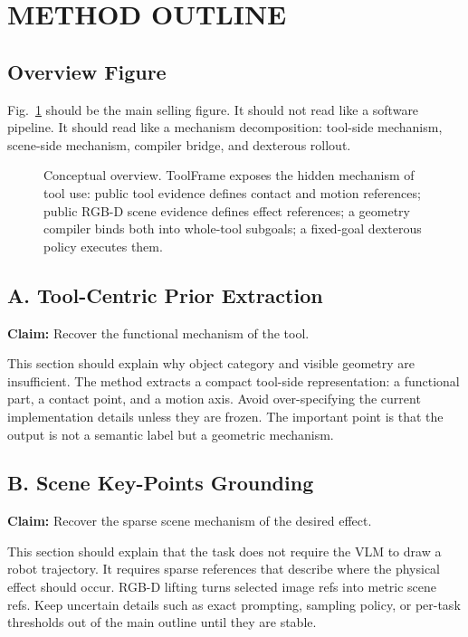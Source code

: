 \documentclass[letterpaper, 10 pt, conference]{ieeeconf}
\newcommand{\method}{ToolFrame}
\newcommand{\claim}[1]{\textbf{Claim:} #1}
\begin{document}
\section{METHOD OUTLINE}

\subsection{Overview Figure}
Fig.~\ref{fig:overview} should be the main selling figure. It should not read
like a software pipeline. It should read like a mechanism decomposition:
tool-side mechanism, scene-side mechanism, compiler bridge, and dexterous
rollout.

\begin{figure}[t]
\centering
{}
\caption{Conceptual overview. \method{} exposes the hidden mechanism of tool
use: public tool evidence defines contact and motion references; public RGB-D
scene evidence defines effect references; a geometry compiler binds both into
whole-tool subgoals; a fixed-goal dexterous policy executes them.}
\label{fig:overview}
\end{figure}

\subsection{A. Tool-Centric Prior Extraction}
\claim{Recover the functional mechanism of the tool.}

This section should explain why object category and visible geometry are
insufficient. The method extracts a compact tool-side representation: a
functional part, a contact point, and a motion axis. Avoid over-specifying the
current implementation details unless they are frozen. The important point is
that the output is not a semantic label but a geometric mechanism.

\subsection{B. Scene Key-Points Grounding}
\claim{Recover the sparse scene mechanism of the desired effect.}

This section should explain that the task does not require the VLM to draw a
robot trajectory. It requires sparse references that describe where the
physical effect should occur. RGB-D lifting turns selected image refs into
metric scene refs. Keep uncertain details such as exact prompting, sampling
policy, or per-task thresholds out of the main outline until they are stable.
\end{document}
